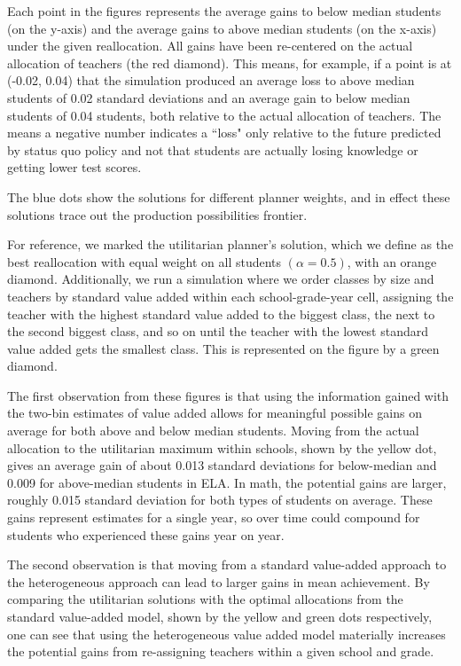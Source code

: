 \documentclass[12pt]{article}
\theoremstyle{definition}
\theoremstyle{definition}
\theoremstyle{definition}
\theoremstyle{definition}
\begin{document}
	Each point in the figures represents the average gains to below median students (on the y-axis) and the average gains to above median students (on the x-axis) under the given reallocation. All gains have been re-centered on the actual allocation of teachers (the red diamond). This means, for example, if a point is at (-0.02, 0.04) that the simulation produced an average loss to above median students of 0.02 standard deviations and an average gain to below median students of 0.04 students, both relative to the actual allocation of teachers. The means a negative number indicates a ``loss" only relative to the future predicted by status quo policy and not that students are actually losing knowledge or getting lower test scores. 

 The blue dots show the solutions for different planner weights, and in effect these solutions trace out the production possibilities frontier.

	For reference, we marked the utilitarian planner's solution, which we define as the best reallocation with equal weight on all students $(\alpha=0.5)$, with an orange diamond. Additionally, we run a simulation where we order classes by size and teachers by standard value added within each school-grade-year cell, assigning the teacher with the highest standard value added to the biggest class, the next to the second biggest class, and so on until the teacher with the lowest standard value added gets the smallest class. This is represented on the figure by a green diamond.

	The first observation from these figures is that using the information gained with the two-bin estimates of value added allows for meaningful possible gains on average for both above and below median students. Moving from the actual allocation to the utilitarian maximum within schools, shown by the yellow dot, gives an average gain of about 0.013 standard deviations for below-median and 0.009 for above-median students in ELA.  In math, the potential gains are larger, roughly 0.015 standard deviation for both types of students on average. These gains represent estimates for a single year, so over time could compound for students who experienced these gains year on year. 

 The second observation is that moving from a standard value-added approach to the heterogeneous approach can lead to larger gains in mean achievement. By comparing the utilitarian solutions with the optimal allocations from the standard value-added model, shown by the yellow and green dots respectively, one can see that using the heterogeneous value added model materially increases the potential gains from re-assigning teachers within a given school and grade. 
 
\end{document}
